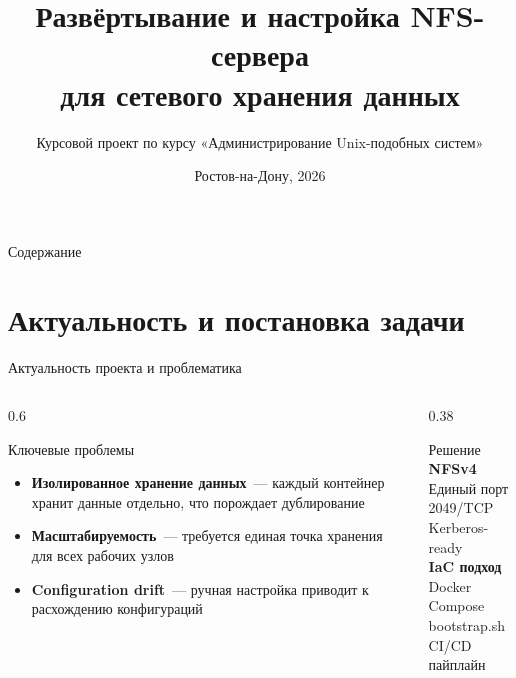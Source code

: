 \documentclass[aspectratio=169,14pt]{beamer}
\title{Развёртывание и настройка NFS-сервера\\для сетевого хранения данных}
\subtitle{Курсовой проект по курсу «Администрирование Unix-подобных систем»}
\author{\AuthorG \and \AuthorK \and \AuthorKr}
\institute{ЮФУ · Физический факультет}
\date{Ростов-на-Дону, 2026}
\begin{document}
	
	\begin{frame}
		\titlepage
	\end{frame}
	
	\begin{frame}{Содержание}
		\tableofcontents[hideallsubsections]
	\end{frame}
	
	\section{Актуальность и постановка задачи}
	
	\begin{frame}{Актуальность проекта и проблематика}
		\begin{columns}[T]
			\begin{column}{0.6\textwidth}
				\begin{block}{Ключевые проблемы}
					\begin{itemize}
						\item \textbf{Изолированное хранение данных}~— каждый контейнер хранит данные отдельно, что порождает дублирование
						\item \textbf{Масштабируемость}~— требуется единая точка хранения для всех рабочих узлов
						\item \textbf{Configuration drift}~— ручная настройка приводит к расхождению конфигураций
					\end{itemize}
				\end{block}
			\end{column}
			\begin{column}{0.38\textwidth}
				\begin{alertblock}{Решение}
					\centering
					\textbf{NFSv4}\\[2pt]
					Единый порт 2049/TCP\\
					Kerberos-ready\\[6pt]
					\textbf{IaC подход}\\[2pt]
					Docker Compose\\
					bootstrap.sh\\
					CI/CD пайплайн
				\end{alertblock}
			\end{column}
		\end{columns}
	\end{frame}
	
\end{document}
